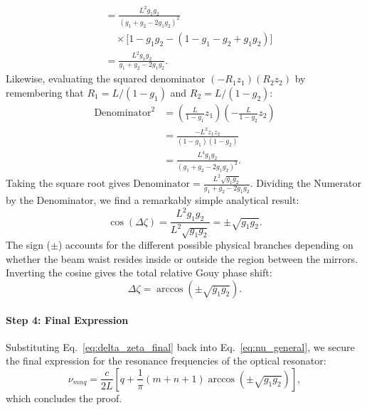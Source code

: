 \begin{resolucao}[Solution]
\begin{align*}
                &= \frac{L^2 g_1 g_2}{(g_1+g_2-2g_1g_2)^2} \\
                & \quad \times \Big[ 1 - g_1g_2 - (1 - g_1 - g_2 + g_1g_2) \Big] \\
                &= \frac{L^2 g_1 g_2}{g_1+g_2-2g_1g_2}.
            \end{align*}
            Likewise, evaluating the squared denominator $(-R_1 z_1)(R_2 z_2)$ by remembering that $R_1 = L/(1-g_1)$ and $R_2 = L/(1-g_2)$:
            \begin{align*}
                \text{Denominator}^2 &= \left( \frac{L}{1-g_1} z_1 \right) \left( - \frac{L}{1-g_2} z_2 \right) \\
                &= \frac{-L^2 z_1 z_2}{(1-g_1)(1-g_2)} \\
                &= \frac{L^4 g_1 g_2}{(g_1+g_2-2g_1g_2)^2}.
            \end{align*}
            Taking the square root gives $\text{Denominator} = \frac{L^2 \sqrt{g_1 g_2}}{g_1+g_2-2g_1g_2}$. 
            Dividing the Numerator by the Denominator, we find a remarkably simple analytical result:
            \begin{equation}
                \cos(\Delta\zeta) = \frac{L^2 g_1 g_2}{L^2 \sqrt{g_1 g_2}} = \pm \sqrt{g_1 g_2}.
            \end{equation}
            The sign ($\pm$) accounts for the different possible physical branches depending on whether the beam waist resides inside or outside the region between the mirrors. Inverting the cosine gives the total relative Gouy phase shift:
            \begin{equation}
                \Delta\zeta = \arccos\left(\pm\sqrt{g_1 g_2}\right).
                \label{eq:delta_zeta_final}
            \end{equation}
    
        \paragraph*{Step 4: Final Expression}
            Substituting Eq.~\eqref{eq:delta_zeta_final} back into Eq.~\eqref{eq:nu_general}, we secure the final expression for the resonance frequencies of the optical resonator:
            \begin{equation}
                \nu_{mnq} = \frac{c}{2L} \left[ q + \frac{1}{\pi}(m+n+1) \arccos\left(\pm\sqrt{g_1 g_2}\right) \right],
            \end{equation}
            which concludes the proof.


\end{resolucao}
